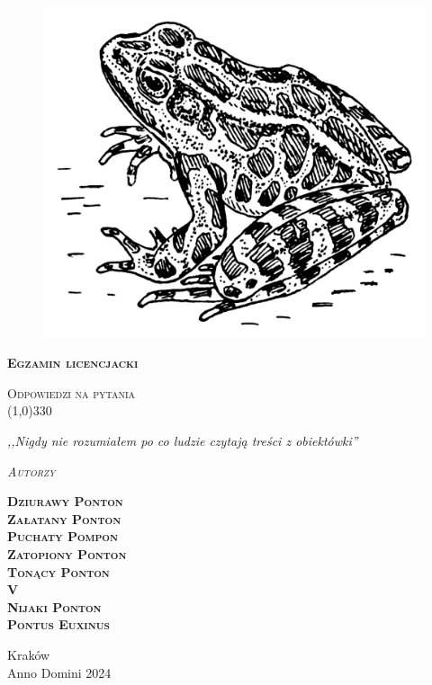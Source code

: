 \begin{titlepage} 
    \begin{center}
         \begin{figure}[H]
            \centering
            \includegraphics[scale=1]{img/Frog_(PSF).png}
           
        \end{figure}
        
        \Huge
        \textbf{\textsc{Egzamin licencjacki}}
        
        \vspace{0.5cm}
        \Large
        \textsc{Odpowiedzi na pytania} \\ 
        \line(1,0){330}

        \normalsize
        \textit{,,Nigdy nie rozumiałem po co ludzie czytają treści z obiektówki''}
        \vspace{1cm}

        \textit{\textsc{Autorzy}}\\
        \vspace{5mm}
  
        \textbf{\textsc{Dziurawy Ponton} \\ \textsc{Załatany Ponton} \\ \textsc{Puchaty Pompon} \\ \textsc{Zatopiony Ponton} \\ \textsc{Tonący Ponton}\\ \textsc{V} \\ \textsc{Nijaki Ponton} \\ \textsc{Pontus Euxinus}} \\
 
        \vfill

        Kraków \\
        Anno Domini 2024
    \end{center}
\end{titlepage}